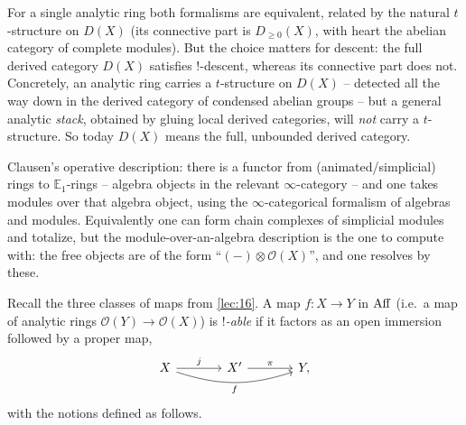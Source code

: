 \begin{remark}
\label{rmk:17:full-derived}
For a single analytic ring both formalisms are equivalent, related by the natural
$t$-structure on $D(X)$ (its connective part is $D_{\ge0}(X)$, with heart the abelian
category of complete modules). But the choice matters for descent: the full derived
category $D(X)$ satisfies $!$-descent, whereas its connective part does not. Concretely,
an analytic ring carries a $t$-structure on $D(X)$ -- detected all the way down in the
derived category of condensed abelian groups -- but a general analytic \emph{stack},
obtained by gluing local derived categories, will \emph{not} carry a $t$-structure. So
today $D(X)$ means the full, unbounded derived category.
\end{remark}

\begin{remark}
\label{rmk:17:working-D}
Clausen's operative description: there is a functor from (animated/simplicial) rings to
$\mathbb{E}_1$-rings -- algebra objects in the relevant $\infty$-category -- and one
takes modules over that algebra object, using the $\infty$-categorical formalism of
algebras and modules. Equivalently one can form chain complexes of simplicial modules
and totalize, but the module-over-an-algebra description is the one to compute with:
the free objects are of the form ``$(-)\otimes \mathcal O(X)$'', and one resolves by these.
\end{remark}

Recall the three classes of maps from \cref{lec:16}. A map $f\colon X\to Y$ in $\operatorname{Aff}$
(i.e.\ a map of analytic rings $\mathcal O(Y)\to\mathcal O(X)$) is \emph{$!$-able} if it
factors as an open immersion followed by a proper map,
\begin{equation}
\label{eq:17:shriekable-factorization}
\begin{tikzcd}[column sep=large]
X \arrow[r, "j"] \arrow[rr, bend right=18, "f"'] & X' \arrow[r, "\pi"] & Y,
\end{tikzcd}
\end{equation}
with the notions defined as follows.

